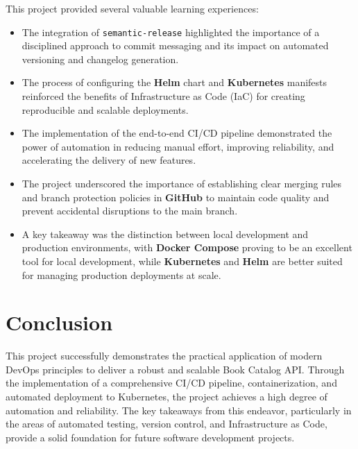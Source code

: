 \documentclass{article}
\begin{document}
This project provided several valuable learning experiences:
\begin{itemize}
    \item The integration of \texttt{semantic-release} highlighted the importance of a disciplined approach to commit messaging and its impact on automated versioning and changelog generation.
    \item The process of configuring the \textbf{Helm} chart and \textbf{Kubernetes} manifests reinforced the benefits of Infrastructure as Code (IaC) for creating reproducible and scalable deployments.
    \item The implementation of the end-to-end CI/CD pipeline demonstrated the power of automation in reducing manual effort, improving reliability, and accelerating the delivery of new features.
    \item The project underscored the importance of establishing clear merging rules and branch protection policies in \textbf{GitHub} to maintain code quality and prevent accidental disruptions to the main branch.
    \item A key takeaway was the distinction between local development and production environments, with \textbf{Docker Compose} proving to be an excellent tool for local development, while \textbf{Kubernetes} and \textbf{Helm} are better suited for managing production deployments at scale.
\end{itemize}

\section{Conclusion}

This project successfully demonstrates the practical application of modern DevOps principles to deliver a robust and scalable Book Catalog API. Through the implementation of a comprehensive CI/CD pipeline, containerization, and automated deployment to Kubernetes, the project achieves a high degree of automation and reliability. The key takeaways from this endeavor, particularly in the areas of automated testing, version control, and Infrastructure as Code, provide a solid foundation for future software development projects.
\end{document}

